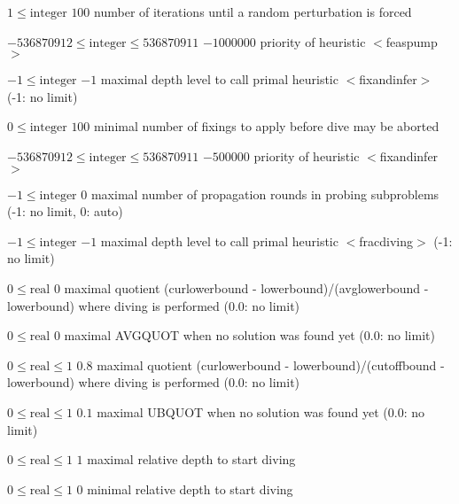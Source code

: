 %
{$1\leq\textrm{integer}$}%
{$100$}%
{number of iterations until a random perturbation is forced}%
{}

%
{$-536870912\leq\textrm{integer}\leq536870911$}%
{$-1000000$}%
{priority of heuristic $<$feaspump$>$}%
{}

%
{$-1\leq\textrm{integer}$}%
{$-1$}%
{maximal depth level to call primal heuristic $<$fixandinfer$>$ (-1: no limit)}%
{}

%
{$0\leq\textrm{integer}$}%
{$100$}%
{minimal number of fixings to apply before dive may be aborted}%
{}

%
{$-536870912\leq\textrm{integer}\leq536870911$}%
{$-500000$}%
{priority of heuristic $<$fixandinfer$>$}%
{}

%
{$-1\leq\textrm{integer}$}%
{$0$}%
{maximal number of propagation rounds in probing subproblems (-1: no limit, 0: auto)}%
{}

%
{$-1\leq\textrm{integer}$}%
{$-1$}%
{maximal depth level to call primal heuristic $<$fracdiving$>$ (-1: no limit)}%
{}

%
{$0\leq\textrm{real}$}%
{$0$}%
{maximal quotient (curlowerbound - lowerbound)/(avglowerbound - lowerbound) where diving is performed (0.0: no limit)}%
{}

%
{$0\leq\textrm{real}$}%
{$0$}%
{maximal AVGQUOT when no solution was found yet (0.0: no limit)}%
{}

%
{$0\leq\textrm{real}\leq1$}%
{$0.8$}%
{maximal quotient (curlowerbound - lowerbound)/(cutoffbound - lowerbound) where diving is performed (0.0: no limit)}%
{}

%
{$0\leq\textrm{real}\leq1$}%
{$0.1$}%
{maximal UBQUOT when no solution was found yet (0.0: no limit)}%
{}

%
{$0\leq\textrm{real}\leq1$}%
{$1$}%
{maximal relative depth to start diving}%
{}

%
{$0\leq\textrm{real}\leq1$}%
{$0$}%
{minimal relative depth to start diving}%
{}

